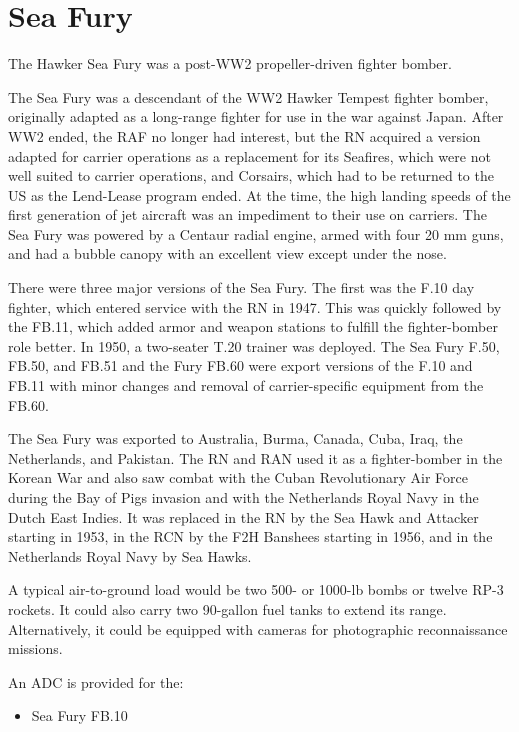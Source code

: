 \section*{Sea Fury}

The Hawker Sea Fury was a post-WW2 propeller-driven fighter bomber. 

The Sea Fury was a descendant of the WW2 Hawker Tempest fighter bomber, originally adapted as a long-range fighter for use in the war against Japan. After WW2 ended, the RAF no longer had interest, but the RN acquired a version adapted for carrier operations as a replacement for its Seafires, which were not well suited to carrier operations, and Corsairs, which had to be returned to the US as the Lend-Lease program ended. At the time, the high landing speeds of the first generation of jet aircraft was an impediment to their use on carriers. The Sea Fury was powered by a Centaur radial engine, armed with four 20 mm guns, and had a bubble canopy with an excellent view except under the nose.

There were three major versions of the Sea Fury. The first was the F.10 day fighter, which entered service with the RN in 1947. This was quickly followed by the FB.11, which added armor and weapon stations to fulfill the fighter-bomber role better. In 1950, a two-seater T.20 trainer was deployed. The Sea Fury F.50, FB.50, and FB.51 and the Fury FB.60 were export versions of the F.10 and FB.11 with minor changes and removal of carrier-specific equipment from the FB.60. 

The Sea Fury was exported to Australia, Burma, Canada, Cuba, Iraq, the Netherlands, and Pakistan. The RN and RAN used it as a fighter-bomber in the Korean War and also saw combat with the Cuban Revolutionary Air Force during the Bay of Pigs invasion and with the Netherlands Royal Navy in the Dutch East Indies. It was replaced in the RN by the Sea Hawk and Attacker starting in 1953, in the RCN by the F2H Banshees starting in 1956, and in the Netherlands Royal Navy by Sea Hawks.

A typical air-to-ground load would be two 500- or 1000-lb bombs or twelve RP-3 rockets. It could also carry two 90-gallon fuel tanks to extend its range. Alternatively, it could be equipped with cameras for photographic reconnaissance missions.

An ADC is provided for the:
\begin{itemize}
\item Sea Fury FB.10
\end{itemize}
